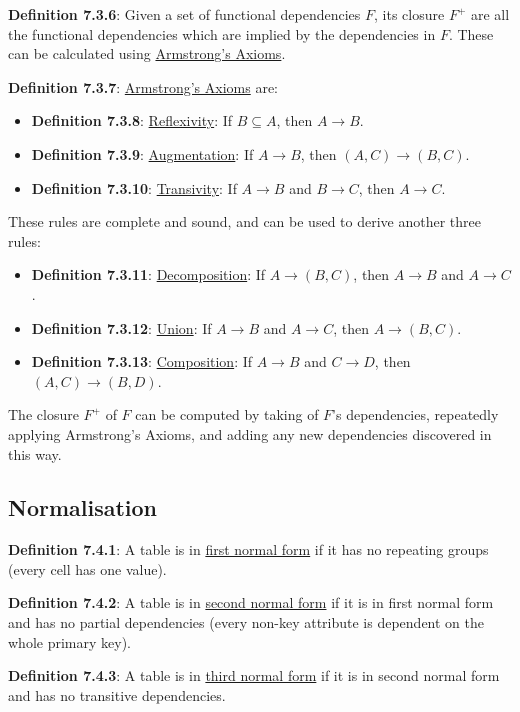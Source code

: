 \documentclass{article}
\newcommand{\separate}[1] {\vspace{#1 pt}\noindent}
\newcommand{\definition}[2]{\textbf{Definition #1}: #2\label{def:#1}}
\begin{document}
\separate{7}\definition{7.3.6}{Given a set of functional dependencies \(F\), its closure \(F^+\) are all the functional dependencies which are implied by the dependencies in \(F\). These can be calculated using \hyperref[def:7.3.7]{Armstrong's Axioms}.}

\newpage\noindent\definition{7.3.7}{\underline{Armstrong's Axioms} are: 
\begin{itemize}
    \item \definition{7.3.8}{\underline{Reflexivity}: If \(B \subseteq A\), then \(A \rightarrow B\).}
    \item \definition{7.3.9}{\underline{Augmentation}: If \(A \rightarrow B\), then \((A,C) \rightarrow (B,C)\).}
    \item \definition{7.3.10}{\underline{Transivity}: If \(A \rightarrow B\) and \(B \rightarrow C\), then \(A \rightarrow C\).}
\end{itemize}} 
These rules are complete and sound, and can be used to derive another three rules:
\begin{itemize}
    \item \definition{7.3.11}{\underline{Decomposition}: If \(A \rightarrow (B,C)\), then \(A \rightarrow B\) and \(A \rightarrow C\).}
    \item \definition{7.3.12}{\underline{Union}: If \(A \rightarrow B\) and \(A \rightarrow C\), then \(A \rightarrow (B,C)\).}
    \item \definition{7.3.13}{\underline{Composition}: If \(A \rightarrow B\) and \(C \rightarrow D\), then \((A,C) \rightarrow (B,D)\).}
\end{itemize}

\separate{7}The closure \(F^+\) of \(F\) can be computed by taking of \(F\)'s dependencies, repeatedly applying Armstrong's Axioms, and adding any new dependencies discovered in this way.

\subsection{Normalisation}

\definition{7.4.1}{A table is in \underline{first normal form} if it has no repeating groups (every cell has one value).}

\separate{7}\definition{7.4.2}{A table is in \underline{second normal form} if it is in first normal form and has no partial dependencies (every non-key attribute is dependent on the whole primary key).}

\separate{7}\definition{7.4.3}{A table is in \underline{third normal form} if it is in second normal form and has no transitive dependencies.}
\end{document}
